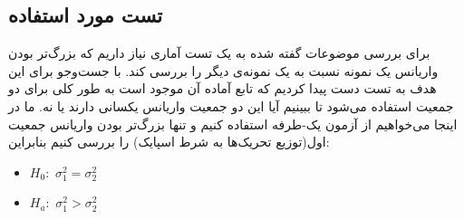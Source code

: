 \documentclass[12pt,onecolumn,a4paper,fleqn]{article}
\begin{document}
\subsection{تست مورد استفاده}
برای بررسی موضوعات گفته شده به یک تست آماری نیاز داریم که بزرگ‌تر بودن واریانس یک نمونه‌ نسبت به یک نمونه‌ی دیگر را بررسی کند. با جست‌وجو برای این هدف به تست  دست پیدا کردیم که تابع آماده آن موجود است به طور کلی  برای دو جمعیت استفاده می‌شود تا ببینیم آیا این دو جمعیت واریانس یکسانی دارند یا نه. ما در اینجا می‌خواهیم از آزمون یک-طرفه استفاده کنیم و تنها بزرگ‌تر بودن واریانس جمعیت اول(توزیع‌ تحریک‌ها به شرط اسپایک) را بررسی کنیم بنابراین:

\begin{latin}
\begin{itemize}
	\item 
	$H_0:$ \space $\sigma_1^2 = \sigma_2^2$
	\item 
	$H_a:$ \space
	$\sigma_1^2 > \sigma_2^2$
\end{itemize}
\end{latin}
\end{document}
